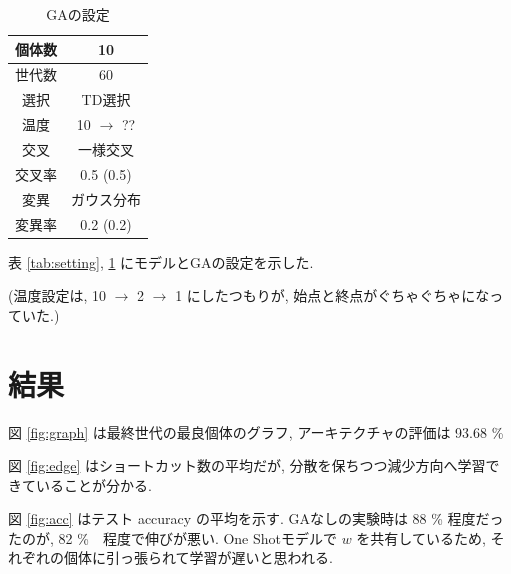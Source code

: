 \documentclass[twocolumn]{jarticle}     %
\begin{document}
\begin{table}[tb]
  \begin{center}
    \caption{GAの設定}
    \begin{tabular}{|c|c|} \hline
      個体数 & 10 \\ \hline
      世代数 & 60 \\ \hline \hline
      選択 & TD選択 \\ \hline
      温度 & 10 $\rightarrow$ ?? \\ \hline \hline
      交叉 & 一様交叉 \\ \hline
      交叉率 & 0.5 (0.5) \\ \hline \hline
      変異 & ガウス分布 \\ \hline
      変異率 & 0.2 (0.2) \\ \hline
    \end{tabular}
    \label{tab:setting_ga}
  \end{center}
\end{table}

表 \ref{tab:setting}, \ref{tab:setting_ga} にモデルとGAの設定を示した.

(温度設定は, 10 $\rightarrow$ 2 $\rightarrow$ 1 にしたつもりが, 始点と終点がぐちゃぐちゃになっていた.)


\section{結果}

図 \ref{fig:graph} は最終世代の最良個体のグラフ, アーキテクチャの評価は 93.68 \%

図 \ref{fig:edge} はショートカット数の平均だが, 分散を保ちつつ減少方向へ学習できていることが分かる.

図 \ref{fig:acc} はテスト accuracy の平均を示す.
GAなしの実験時は 88 \% 程度だったのが, 82 \%　程度で伸びが悪い.
One Shotモデルで $w$ を共有しているため, それぞれの個体に引っ張られて学習が遅いと思われる.
\end{document}
